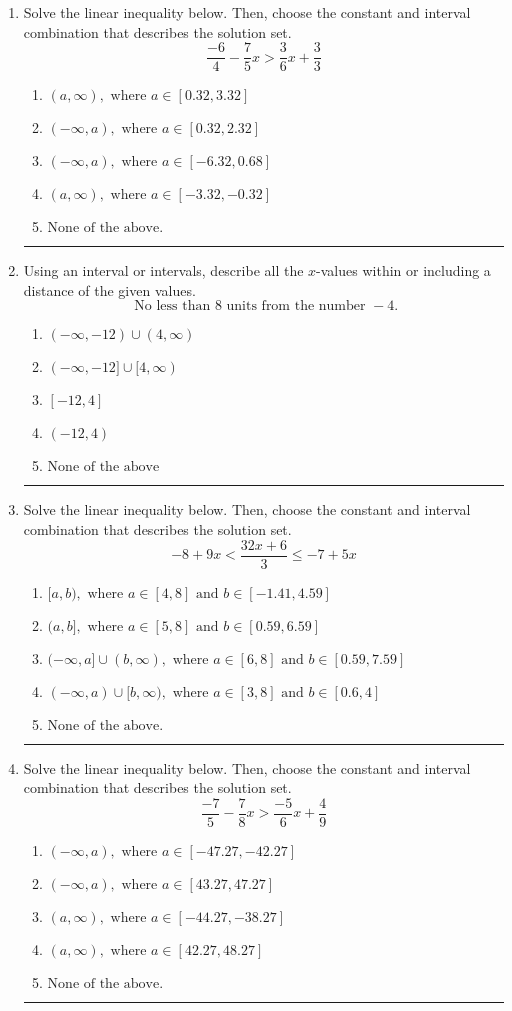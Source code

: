 \documentclass[14pt]{extbook}
\newcommand{\litem}[1]{\item#1\hspace*{-1cm}\rule{\textwidth}{0.4pt}}
\begin{document}
\begin{enumerate}
\litem{
Solve the linear inequality below. Then, choose the constant and interval combination that describes the solution set.\[ \frac{-6}{4} - \frac{7}{5} x > \frac{3}{6} x + \frac{3}{3} \]\begin{enumerate}[label=\Alph*.]
\item \( (a, \infty), \text{ where } a \in [0.32, 3.32] \)
\item \( (-\infty, a), \text{ where } a \in [0.32, 2.32] \)
\item \( (-\infty, a), \text{ where } a \in [-6.32, 0.68] \)
\item \( (a, \infty), \text{ where } a \in [-3.32, -0.32] \)
\item \( \text{None of the above}. \)

\end{enumerate} }
\litem{
Using an interval or intervals, describe all the $x$-values within or including a distance of the given values.\[ \text{ No less than } 8 \text{ units from the number } -4. \]\begin{enumerate}[label=\Alph*.]
\item \( (-\infty, -12) \cup (4, \infty) \)
\item \( (-\infty, -12] \cup [4, \infty) \)
\item \( [-12, 4] \)
\item \( (-12, 4) \)
\item \( \text{None of the above} \)

\end{enumerate} }
\litem{
Solve the linear inequality below. Then, choose the constant and interval combination that describes the solution set.\[ -8 + 9 x < \frac{32 x + 6}{3} \leq -7 + 5 x \]\begin{enumerate}[label=\Alph*.]
\item \( [a, b), \text{ where } a \in [4, 8] \text{ and } b \in [-1.41, 4.59] \)
\item \( (a, b], \text{ where } a \in [5, 8] \text{ and } b \in [0.59, 6.59] \)
\item \( (-\infty, a] \cup (b, \infty), \text{ where } a \in [6, 8] \text{ and } b \in [0.59, 7.59] \)
\item \( (-\infty, a) \cup [b, \infty), \text{ where } a \in [3, 8] \text{ and } b \in [0.6, 4] \)
\item \( \text{None of the above.} \)

\end{enumerate} }
\litem{
Solve the linear inequality below. Then, choose the constant and interval combination that describes the solution set.\[ \frac{-7}{5} - \frac{7}{8} x > \frac{-5}{6} x + \frac{4}{9} \]\begin{enumerate}[label=\Alph*.]
\item \( (-\infty, a), \text{ where } a \in [-47.27, -42.27] \)
\item \( (-\infty, a), \text{ where } a \in [43.27, 47.27] \)
\item \( (a, \infty), \text{ where } a \in [-44.27, -38.27] \)
\item \( (a, \infty), \text{ where } a \in [42.27, 48.27] \)
\item \( \text{None of the above}. \)


\end{enumerate}}
\end{enumerate}
\end{document}
